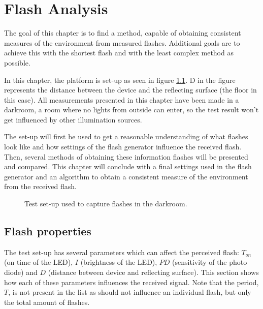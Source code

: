 \chapter{Flash Analysis}
\label{chp:Flash_Analysis}


The goal of this chapter is to find a method, capable of obtaining consistent measures of the environment from measured flashes. Additional goals are to achieve this with the shortest flash and with the least complex method as possible.

In this chapter, the platform is set-up as seen in figure \ref{fig:Flashcapturing}. 
D in the figure represents the distance between the device and the reflecting surface (the floor in this case). All measurements presented in this chapter have been made in a darkroom, a room where no lights from outside can enter, so the test result won't get influenced by other illumination sources.
 
The set-up will first be used to get a reasonable understanding of what flashes look like and how settings of the flash generator influence the received flash. Then, several methods of obtaining these information flashes will be presented and compared. This chapter will conclude with a final settings used in the flash generator and an algorithm to obtain a consistent measure of the environment from the received flash.
\begin{figure}
	\centering     %
	\label{fig:Flashcapturing}
	\caption{Test set-up used to capture flashes in the darkroom.}
\end{figure}

\section{Flash properties}
\label{sec:Flash_generator}
The test set-up has several parameters which can affect the perceived flash: $T_{on}$ (on time of the LED), $I$ (brightness of the LED), $PD$ (sensitivity of the photo diode) and $D$ (distance between device and reflecting surface). This section shows how each of these parameters influences the received signal. Note that the period, $T$, is not present in the list as should not influence an individual flash, but only the total amount of flashes.

